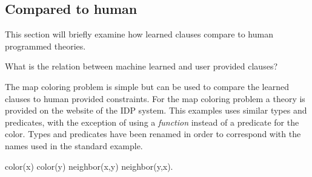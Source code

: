 \subsection{Compared to human}

This section will briefly examine how learned clauses compare to human programmed theories.

\begin{question}
	What is the relation between machine learned and user provided clauses?
\end{question}

\begin{observation}
\label{exp:cd_user_show}
	The map coloring problem is simple but can be used to compare the learned clauses to human provided constraints.
	For the map coloring problem a theory is provided on the website of the IDP system.
	This examples uses similar types and predicates, with the exception of using a \emph{function} instead of a predicate for the color.
	Types and predicates have been renamed in order to correspond with the names used in the standard example.  

	\begin{shiftedflalign*}
		color(x) \neq color(y) \leftarrow neighbor(x,y) \lor neighbor(y,x).
	\end{shiftedflalign*}

\end{observation}


